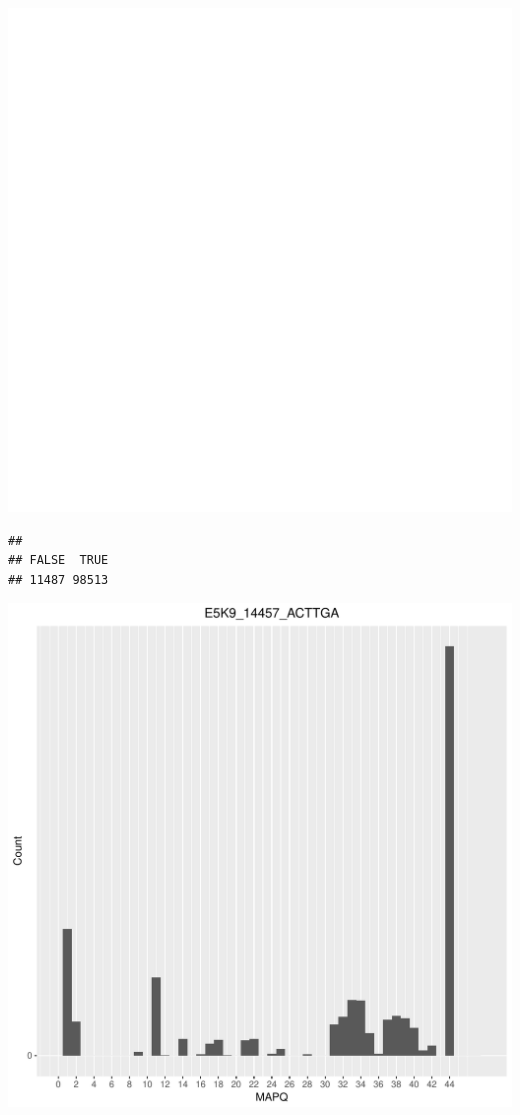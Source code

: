\documentclass[12pt, a4paper]{article}\usepackage[]{graphicx}\usepackage[]{color}
\makeatletter
\def\maxwidth{ %
  \ifdim\Gin@nat@width>\linewidth
    \linewidth
  \else
    \Gin@nat@width
  \fi
}
\newenvironment{kframe}{%
 \def\at@end@of@kframe{}%
 \ifinner\ifhmode%
  \def\at@end@of@kframe{\end{minipage}}%
  \begin{minipage}{\columnwidth}%
 \fi\fi%
 \def\FrameCommand##1{\hskip\@totalleftmargin \hskip-\fboxsep
 \colorbox{shadecolor}{##1}\hskip-\fboxsep
     \hskip-\linewidth \hskip-\@totalleftmargin \hskip\columnwidth}%
 \MakeFramed {\advance\hsize-\width
   \@totalleftmargin\z@ \linewidth\hsize
   \@setminipage}}%
 {\par\unskip\endMakeFramed%
 \at@end@of@kframe}
\newenvironment{knitrout}{}{} %
\makeatother
\begin{document}
\begin{knitrout}
\includegraphics[width=\maxwidth]{figure/unnamed-chunk-3-24} 
\begin{kframe}\begin{verbatim}
## 
## FALSE  TRUE 
## 11487 98513
\end{verbatim}
\end{kframe}
\includegraphics[width=\maxwidth]{figure/unnamed-chunk-3-25} 


\end{knitrout}
\end{document}
